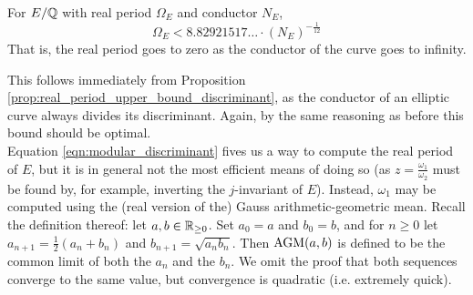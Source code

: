 \begin{corollary}
For $E/\mathbb{Q}$ with real period $\Omega_E$ and conductor $N_E$,
\begin{equation}
\Omega_E < 8.82921517\ldots \cdot (N_E)^{-\frac{1}{12}}
\end{equation}
That is, the real period goes to zero as the conductor of the curve goes to infinity.
\end{corollary}
This follows immediately from Proposition \ref{prop:real_period_upper_bound_discriminant}, as the conductor of an elliptic curve always divides its discriminant. Again, by the same reasoning as before this bound should be optimal. \\

Equation \ref{eqn:modular_discriminant} fives us a way to compute the real period of $E$, but it is in general not the most efficient means of doing so (as $z = \frac{\omega_1}{\omega_2}$ must be found by, for example, inverting the $j$-invariant of $E$). Instead, $\omega_1$ may be computed using the (real version of the) Gauss arithmetic-geometric mean. Recall the definition thereof: let $a,b \in \mathbb{R}_{\ge0}$. Set $a_0 = a$ and $b_0 = b$, and for $n\ge 0$ let $a_{n+1} = \frac{1}{2}(a_{n}+b_{n})$ and $b_{n+1} = \sqrt{a_{n}b_{n}}$. Then $\text{AGM}(a,b)$ is defined to be the common limit of both the $a_n$ and the $b_n$. We omit the proof that both sequences converge to the same value, but convergence is quadratic (i.e. extremely quick).

